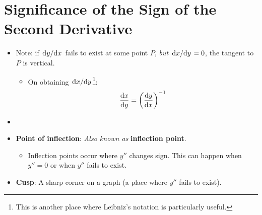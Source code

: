 \documentclass[../main.tex]{subfiles}
\begin{document}
\section{Significance of the Sign of the Second Derivative}
\begin{itemize}
    \item Note: if $\dv*{y}{x}$ fails to exist at some point $P$, \emph{but} $\dv*{x}{y}=0$, the tangent to $P$ is vertical.
    \begin{itemize}
        \item On obtaining $\dv*{x}{y}$\footnote{This is another place where Leibniz's notation is particularly useful.}:
        \begin{equation*}
            \dv{x}{y} = \left( \dv{y}{x} \right)^{-1}
        \end{equation*}
    \end{itemize}
    \item {}
    \item \textbf{Point of inflection}:  \emph{Also known as} \textbf{inflection point}.
    \begin{itemize}
        \item Inflection points occur where $y''$ changes sign. This can happen when $y''=0$ or when $y''$ fails to exist.
    \end{itemize}
    \item \textbf{Cusp}: A sharp corner on a graph (a place where $y''$ fails to exist).
\end{itemize}
\end{document}
